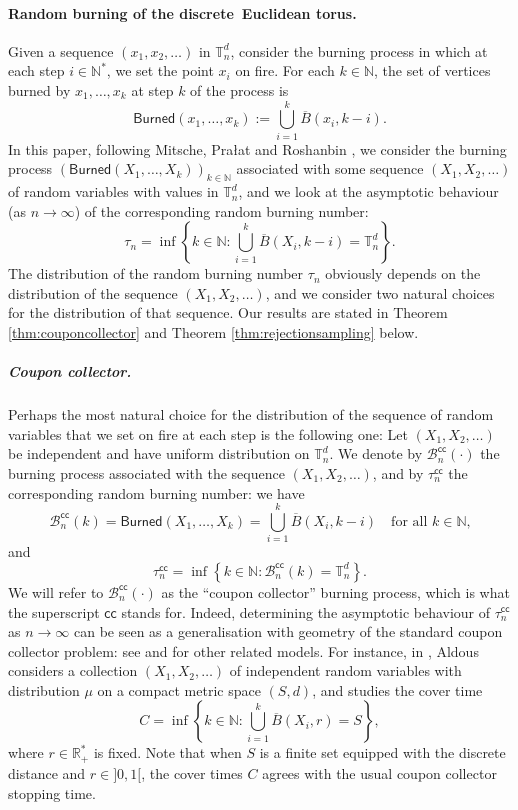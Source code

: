 \documentclass[a4paper,11pt]{article}
\begin{document}
\paragraph{Random burning of the discrete Euclidean torus.}
Given a sequence $(x_1,x_2,\ldots)$ in $\mathbb{T}_n^d$, consider the burning process in which at each step $i\in\mathbb{N}^*$, we set the point $x_i$ on fire.
For each $k\in\mathbb{N}$, the set of vertices burned by $x_1,\ldots,x_k$ at step $k$ of the process is
\[\mathsf{Burned}(x_1,\ldots,x_k):=\bigcup_{i=1}^k\overline{B}(x_i,k-i).\]
In this paper, following Mitsche, Pra\l{}at and Roshanbin \cite{mitschepralatroshanbin}, we consider the burning process ${(\mathsf{Burned}(X_1,\ldots,X_k))_{k\in\mathbb{N}}}$ associated with some sequence $(X_1,X_2,\ldots)$ of random variables with values in $\mathbb{T}_n^d$, and we look at the asymptotic behaviour (as $n\to\infty$) of the corresponding random burning number:
\[\tau_n=\inf\left\{k\in\mathbb{N}:\bigcup_{i=1}^k\overline{B}(X_i,k-i)=\mathbb{T}_n^d\right\}.\]
The distribution of the random burning number $\tau_n$ obviously depends on the distribution of the sequence $(X_1,X_2,\ldots)$, and we consider two natural choices for the distribution of that sequence.
Our results are stated in Theorem \ref{thm:couponcollector} and Theorem \ref{thm:rejectionsampling} below.

\subparagraph{Coupon collector.}
Perhaps the most natural choice for the distribution of the sequence of random variables that we set on fire at each step is the following one:
Let $(X_1,X_2,\ldots)$ be independent and have uniform distribution on $\mathbb{T}_n^d$.
We denote by $\mathcal{B}_n^\mathsf{cc}(\cdot)$ the burning process associated with the sequence $(X_1,X_2,\ldots)$, and by $\tau_n^\mathsf{cc}$ the corresponding random burning number: we have
\[\mathcal{B}_n^\mathsf{cc}(k)=\mathsf{Burned}(X_1,\ldots,X_k)=\bigcup_{i=1}^k\overline{B}(X_i,k-i)\quad\text{for all $k\in\mathbb{N}$,}\]
and
\[\tau_n^\mathsf{cc}=\inf\left\{k\in\mathbb{N}:\mathcal{B}_n^\mathsf{cc}(k)=\mathbb{T}_n^d\right\}.\]
We will refer to $\mathcal{B}_n^\mathsf{cc}(\cdot)$ as the ``coupon collector'' burning process, which is what the superscript $\mathsf{cc}$ stands for.
Indeed, determining the asymptotic behaviour of $\tau_n^\mathsf{cc}$ as $n\to\infty$ can be seen as a generalisation with geometry of the standard coupon collector problem: see \cite{aldous} and \cite{camposteixeira} for other related models.
For instance, in \cite[Section 2]{aldous}, Aldous considers a collection $(X_1,X_2,\ldots)$ of independent random variables with distribution $\mu$ on a compact metric space $(S,d)$, and studies the cover time
\[C=\inf\left\{k\in\mathbb{N}:\bigcup_{i=1}^k\overline{B}(X_i,r)=S\right\},\]
where $r\in\mathbb{R}_+^*$ is fixed.
Note that when $S$ is a finite set equipped with the discrete distance and $r\in{]0,1[}$, the cover times $C$ agrees with the usual coupon collector stopping time.
\end{document}
